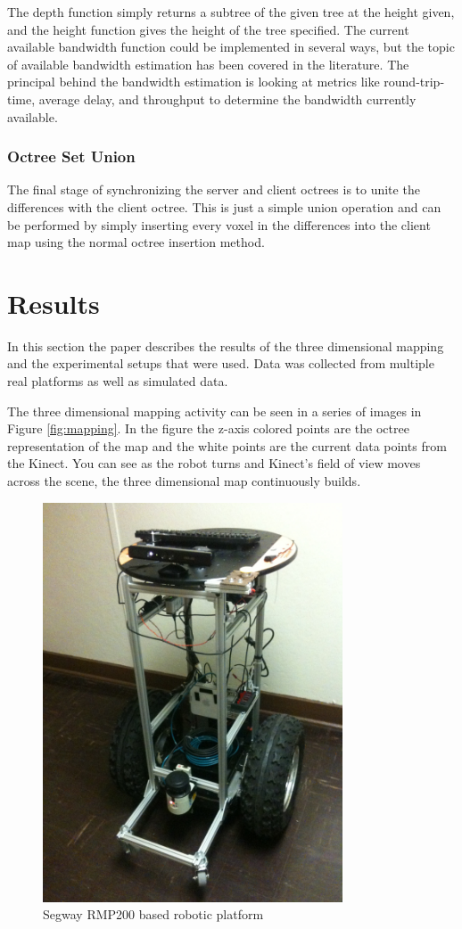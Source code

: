 \documentclass[journal]{IEEEtran}
\begin{document}
  The depth function simply returns a subtree of the given tree at the height
  given, and the height function gives the height of the tree specified. The
  current available bandwidth function could be implemented in several ways,
  but the topic of available bandwidth estimation has been covered in the
  literature.\cite{prasad2003bandwidth} The principal behind the bandwidth
  estimation is looking at metrics like round-trip-time, average delay, and
  throughput to determine the bandwidth currently available.
  
  \subsubsection{Octree Set Union}
  The final stage of synchronizing the server and client octrees is to unite
  the differences with the client octree. This is just a simple union
  operation and can be performed by simply inserting every voxel in the
  differences into the client map using the normal octree insertion
  method.\cite{meagher1982geometric}
  
  \section{Results}
  In this section the paper describes the results of the three dimensional
  mapping and the experimental setups that were used. Data was collected from
  multiple real platforms as well as simulated data.
  
  The three dimensional mapping activity can be seen in a series of images in
  Figure \ref{fig:mapping}. In the figure the z-axis colored points are the
  octree representation of the map and the white points are the current data
  points from the Kinect. You can see as the robot turns and Kinect's field of
  view moves across the scene, the three dimensional map continuously builds.
  
  \begin{figure}[here]
    \centering
    \includegraphics[width=3.5in,keepaspectratio]{segway.jpg}
    \caption{Segway RMP200 based robotic platform}
    \label{fig:segway}
  \end{figure}
  
\end{document}
